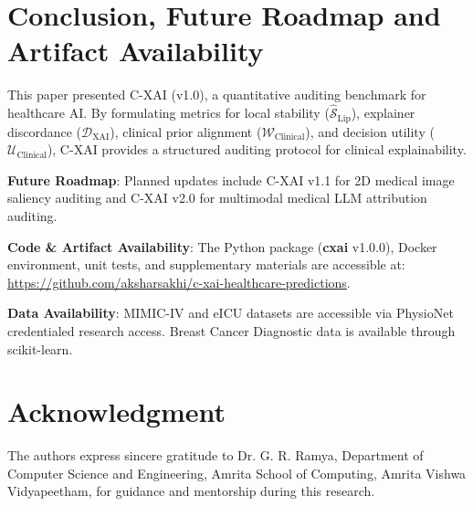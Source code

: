\documentclass[3p,times,procedia]{elsarticle}
\theoremstyle{definition}
\begin{document}
\section{Conclusion, Future Roadmap and Artifact Availability}
This paper presented C-XAI (v1.0), a quantitative auditing benchmark for healthcare AI. By formulating metrics for local stability ($\widehat{\mathcal{S}}_{\text{Lip}}$), explainer discordance ($\mathcal{D}_{\text{XAI}}$), clinical prior alignment ($\mathcal{W}_{\text{Clinical}}$), and decision utility ($\mathcal{U}_{\text{Clinical}}$), C-XAI provides a structured auditing protocol for clinical explainability.

\textbf{Future Roadmap}: Planned updates include C-XAI v1.1 for 2D medical image saliency auditing and C-XAI v2.0 for multimodal medical LLM attribution auditing.

\textbf{Code \& Artifact Availability}: The Python package (\textbf{cxai} v1.0.0), Docker environment, unit tests, and supplementary materials are accessible at: \href{https://github.com/aksharsakhi/c-xai-healthcare-predictions}{https://github.com/aksharsakhi/c-xai-healthcare-predictions}.

\textbf{Data Availability}: MIMIC-IV and eICU datasets are accessible via PhysioNet credentialed research access. Breast Cancer Diagnostic data is available through scikit-learn.

\section*{Acknowledgment}
The authors express sincere gratitude to Dr. G. R. Ramya, Department of Computer Science and Engineering, Amrita School of Computing, Amrita Vishwa Vidyapeetham, for guidance and mentorship during this research.

\vspace*{-12pt}
{\scriptsize


}
\end{document}
